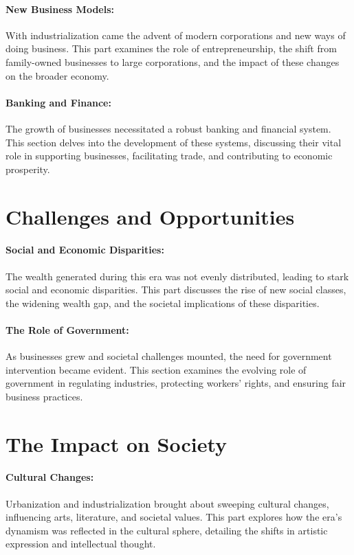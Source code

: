 \documentclass[a4paper,12pt]{book}
\begin{document}
\paragraph{New Business Models:}
With industrialization came the advent of modern corporations and new ways of doing business. This part examines the role of entrepreneurship, the shift from family-owned businesses to large corporations, and the impact of these changes on the broader economy.

\paragraph{Banking and Finance:}
The growth of businesses necessitated a robust banking and financial system. This section delves into the development of these systems, discussing their vital role in supporting businesses, facilitating trade, and contributing to economic prosperity.

\section*{Challenges and Opportunities}

\paragraph{Social and Economic Disparities:}
The wealth generated during this era was not evenly distributed, leading to stark social and economic disparities. This part discusses the rise of new social classes, the widening wealth gap, and the societal implications of these disparities.

\paragraph{The Role of Government:}
As businesses grew and societal challenges mounted, the need for government intervention became evident. This section examines the evolving role of government in regulating industries, protecting workers’ rights, and ensuring fair business practices.

\section*{The Impact on Society}

\paragraph{Cultural Changes:}
Urbanization and industrialization brought about sweeping cultural changes, influencing arts, literature, and societal values. This part explores how the era’s dynamism was reflected in the cultural sphere, detailing the shifts in artistic expression and intellectual thought.
\end{document}
